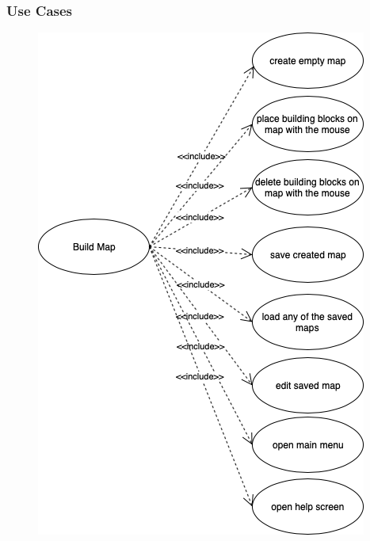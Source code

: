 \documentclass{beamer}
\begin{document}
\begin{frame}
    \frametitle{Use Cases}
    \begin{figure}
        \includegraphics[scale=0.25]{resources/Use_Case_Build_Map.png}

    \end{figure}

\end{frame}
 
\end{document}
